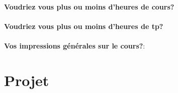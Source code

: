 \documentclass[10pt,a4wide]{article}
\begin{document}
\paragraph{}

\textbf{Voudriez vous plus ou moins d'heures de cours?}
\paragraph{}
\paragraph{}
\paragraph{}

\textbf{Voudriez vous plus ou moins d'heures de tp?}
\paragraph{}
\paragraph{}
\paragraph{}

\textbf{Vos impressions g\'en\'erales sur le cours?}:
\paragraph{}
\paragraph{}
\paragraph{}
\paragraph{}
\paragraph{}



\section{Projet}
\end{document}
